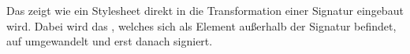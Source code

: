 Das  zeigt wie ein Stylesheet direkt in die Transformation einer Signatur eingebaut wird. Dabei wird das 
, welches sich als Element außerhalb der Signatur befindet, auf  umgewandelt und erst danach signiert.



